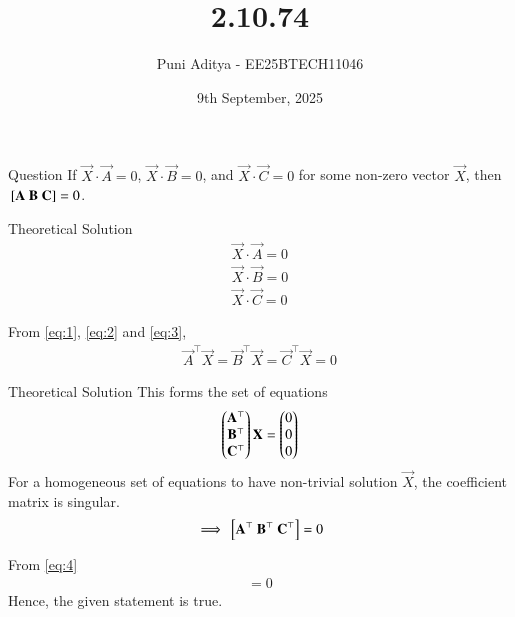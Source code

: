 \documentclass{beamer}
\title{2.10.74}
\date{9th September, 2025}
\author{Puni Aditya - EE25BTECH11046}
\begin{document}
\frame{\titlepage}
\begin{frame}{Question}
If $\vec{X} \cdot \vec{A} = 0$, $\vec{X} \cdot \vec{B} = 0$, and $\vec{X} \cdot \vec{C} = 0$ for some non-zero vector $\vec{X}$, then ${}\left[\mathbf{A}\ \mathbf{B}\ \mathbf{C}\right] = 0$.
\end{frame}

\begin{frame}{Theoretical Solution}
\begin{align}
    \vec{X} \cdot \vec{A} = 0 \label{eq:1} \\
    \vec{X} \cdot \vec{B} = 0 \label{eq:2} \\
    \vec{X} \cdot \vec{C} = 0 \label{eq:3}
\end{align}

From \eqref{eq:1}, \eqref{eq:2} and \eqref{eq:3},
\begin{align}
    \vec{A}^\top \vec{X} = \vec{B}^\top \vec{X} = \vec{C}^\top \vec{X} = 0
\end{align}
\end{frame}

\begin{frame}{Theoretical Solution}
This forms the set of equations
\begin{align}
    \begin{pmatrix}\mathbf{A}^\top \\ \mathbf{B}^\top \\ \mathbf{C}^\top\end{pmatrix} \mathbf{X} = \begin{pmatrix}0 \\ 0 \\ 0\end{pmatrix}
\end{align}
For a homogeneous set of equations to have non-trivial solution $\vec{X}$, the coefficient matrix is singular.
\begin{align}
    \implies {}\left[\mathbf{A}^\top\ \mathbf{B}^\top\ \mathbf{C}^\top\right] = 0 \label{eq:4}
\end{align}

From \eqref{eq:4}
\begin{align}
    [\vec{A}\ \vec{B}\ \vec{C}] = 0
\end{align}
Hence, the given statement is true.
\end{frame}
\end{document}
